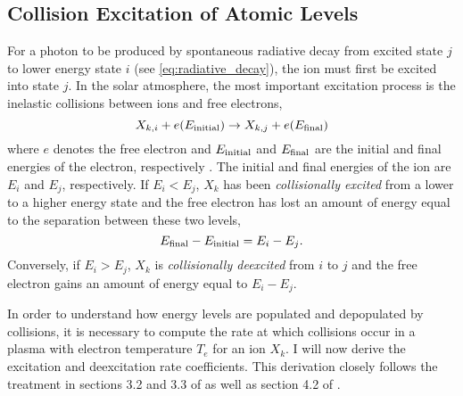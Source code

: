 \subsection{Collision Excitation of Atomic Levels}\label{subsec:collisional_excitation}

For a photon to be produced by spontaneous radiative decay from excited state $j$ to lower energy state $i$ (see \autoref{eq:radiative_decay}), the ion must first be excited into state $j$. In the solar atmosphere, the most important excitation process is the inelastic collisions between ions and free electrons,
\begin{equation}\label{eq:inelastic_collisions}
    X_{k,i} + e(E_{\textup{initial}}) \to X_{k,j} + e(E_{\textup{final}})
\end{equation}
where $e$ denotes the free electron and $E_{\textup{initial}}$ and $E_{\textup{final}}$ are the initial and final energies of the electron, respectively \citep{phillips_ultraviolet_2008}. The initial and final energies of the ion are $E_i$ and $E_j$, respectively. If $E_i<E_j$, $X_k$ has been \textit{collisionally excited} from a lower to a higher energy state and the free electron has lost an amount of energy equal to the separation between these two levels,
\begin{equation*}
    E_{\textup{final}} - E_{\textup{initial}}  = E_i - E_j.
\end{equation*}
Conversely, if $E_i>E_j$, $X_k$ is \textit{collisionally deexcited} from $i$ to $j$ and the free electron gains an amount of energy equal to $E_i - E_j$.

In order to understand how energy levels are populated and depopulated by collisions, it is necessary to compute the rate at which collisions occur in a plasma with electron temperature $T_e$ for an ion $X_k$. I will now derive the excitation and deexcitation rate coefficients. This derivation closely follows the treatment in sections 3.2 and 3.3 of \citet{del_zanna_solar_2018} as well as section 4.2 of \citet{phillips_ultraviolet_2008}.


